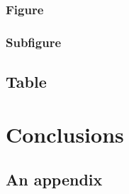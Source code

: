 \documentclass[12pt,a4paper,twoside]{report}
\begin{document}
      \subsection{Figure}
        \label{sec:fig}
        

      \FloatBarrier

      \subsection{Subfigure}
        \label{sec:subfig}
        

     \clearpage

    \section{Table}
      \label{sec:tbl}
      

  \cleardoublepage

  \chapter{Conclusions}
    \label{sec:outro}
    

  \nocite{*}  %
  
  

  \appendixpage
  \addappheadtotoc

  \renewcommand\thesection{\Alph{section}}

  \appendix
    \section{An appendix}
    \label{sec:app}
    
\end{document}
